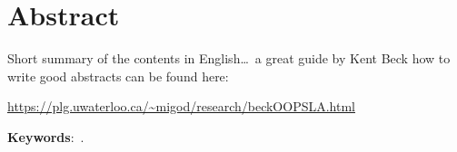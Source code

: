 

\begingroup
\let\clearpage\relax
\let\cleardoublepage\relax
\let\cleardoublepage\relax

\chapter*{Abstract}
Short summary of the contents in English\dots~a great guide by
Kent Beck how to write good abstracts can be found here:
\begin{center}
\url{https://plg.uwaterloo.ca/~migod/research/beckOOPSLA.html}
\end{center}

\bigskip\bigskip\bigskip\bigskip
\textbf{Keywords}:~\mykeywords.



\endgroup

